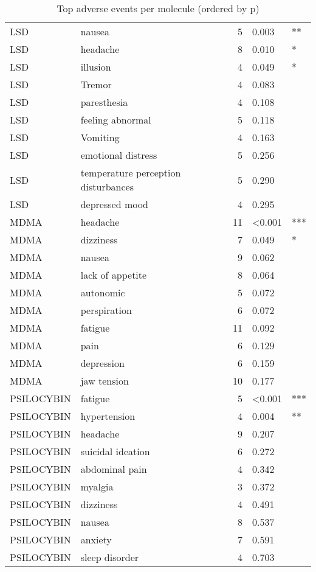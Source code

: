 \begin{table}[!h]
\centering
\caption{Top adverse events per molecule (ordered by p)}
\centering
\begin{tabular}[t]{llrll}
\toprule
LSD & nausea & 5 & 0.003 & **\\
LSD & headache & 8 & 0.010 & *\\
LSD & illusion & 4 & 0.049 & *\\
LSD & Tremor & 4 & 0.083 & \\
LSD & paresthesia & 4 & 0.108 & \\
\addlinespace
LSD & feeling abnormal & 5 & 0.118 & \\
LSD & Vomiting & 4 & 0.163 & \\
LSD & emotional distress & 5 & 0.256 & \\
LSD & temperature perception disturbances & 5 & 0.290 & \\
LSD & depressed mood & 4 & 0.295 & \\
\addlinespace
MDMA & headache & 11 & <0.001 & ***\\
MDMA & dizziness & 7 & 0.049 & *\\
MDMA & nausea & 9 & 0.062 & \\
MDMA & lack of appetite & 8 & 0.064 & \\
MDMA & autonomic & 5 & 0.072 & \\
\addlinespace
MDMA & perspiration & 6 & 0.072 & \\
MDMA & fatigue & 11 & 0.092 & \\
MDMA & pain & 6 & 0.129 & \\
MDMA & depression & 6 & 0.159 & \\
MDMA & jaw tension & 10 & 0.177 & \\
\addlinespace
PSILOCYBIN & fatigue & 5 & <0.001 & ***\\
PSILOCYBIN & hypertension & 4 & 0.004 & **\\
PSILOCYBIN & headache & 9 & 0.207 & \\
PSILOCYBIN & suicidal ideation & 6 & 0.272 & \\
PSILOCYBIN & abdominal pain & 4 & 0.342 & \\
\addlinespace
PSILOCYBIN & myalgia & 3 & 0.372 & \\
PSILOCYBIN & dizziness & 4 & 0.491 & \\
PSILOCYBIN & nausea & 8 & 0.537 & \\
PSILOCYBIN & anxiety & 7 & 0.591 & \\
PSILOCYBIN & sleep disorder & 4 & 0.703 & \\
\bottomrule
\end{tabular}
\end{table}
